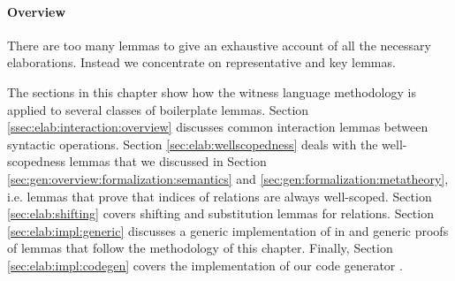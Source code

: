 \paragraph{Overview}

There are too many lemmas to give an exhaustive account of all the
necessary elaborations. Instead we concentrate on representative and key lemmas.

The sections in this chapter show how the witness language methodology is
applied to several classes of boilerplate lemmas. Section
\ref{ssec:elab:interaction:overview} discusses common interaction lemmas between
syntactic operations. Section \ref{sec:elab:wellscopedness} deals with the
well-scopedness lemmas that we discussed in Section
\ref{sec:gen:overview:formalization:semantics} and
\ref{sec:gen:formalization:metatheory}, i.e. lemmas that prove that indices of
relations are always well-scoped. Section \ref{sec:elab:shifting} covers
shifting and substitution lemmas for relations. Section
\ref{sec:elab:impl:generic} discusses a generic implementation of \Knot in \Coq
and generic proofs of lemmas that follow the methodology of this chapter.
Finally, Section \ref{sec:elab:impl:codegen} covers the implementation of our
code generator \Needle.






 \clearpage






